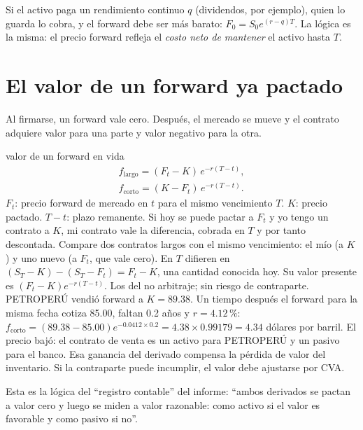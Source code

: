 \begin{adicional}
Si el activo paga un rendimiento continuo $q$ (dividendos, por ejemplo), quien lo guarda lo cobra, y el forward debe ser más barato: $F_0=S_0e^{(r-q)T}$. La lógica es la misma: el precio forward refleja el \emph{costo neto de mantener} el activo hasta $T$.
\end{adicional}

\section{El valor de un forward ya pactado}

Al firmarse, un forward vale cero. Después, el mercado se mueve y el contrato adquiere valor para una parte y valor negativo para la otra.

\begin{ficha}{valor de un forward en vida}
\begin{gather*} f_{\text{largo}}=(F_t-K)\,e^{-r(T-t)},\\ f_{\text{corto}}=(K-F_t)\,e^{-r(T-t)}. \end{gather*}
 $F_t$: precio forward de mercado en $t$ para el mismo vencimiento $T$. $K$: precio pactado. $T-t$: plazo remanente.
 Si hoy se puede pactar a $F_t$ y yo tengo un contrato a $K$, mi contrato vale la diferencia, cobrada en $T$ y por tanto descontada.
 Compare dos contratos largos con el mismo vencimiento: el mío (a $K$) y uno nuevo (a $F_t$, que vale cero). En $T$ difieren en $(S_T-K)-(S_T-F_t)=F_t-K$, una cantidad conocida hoy. Su valor presente es $(F_t-K)e^{-r(T-t)}$.
 Los del no arbitraje; sin riesgo de contraparte.
 PETROPERÚ vendió forward a $K=89.38$. Un tiempo después el forward para la misma fecha cotiza 85.00, faltan 0.2 años y $r=4.12\,\%$: $f_{\text{corto}}=(89.38-85.00)e^{-0.0412\times0.2}=4.38\times0.99179=4.34$ dólares por barril.
 El precio bajó: el contrato de venta es un activo para PETROPERÚ y un pasivo para el banco. Esa ganancia del derivado compensa la pérdida de valor del inventario.
 Si la contraparte puede incumplir, el valor debe ajustarse por CVA.
\end{ficha}

\begin{informe}
Esta es la lógica del \enquote{registro contable} del informe: \enquote{ambos derivados se pactan a valor cero y luego se miden a valor razonable: como activo si el valor es favorable y como pasivo si no}.
\end{informe}

